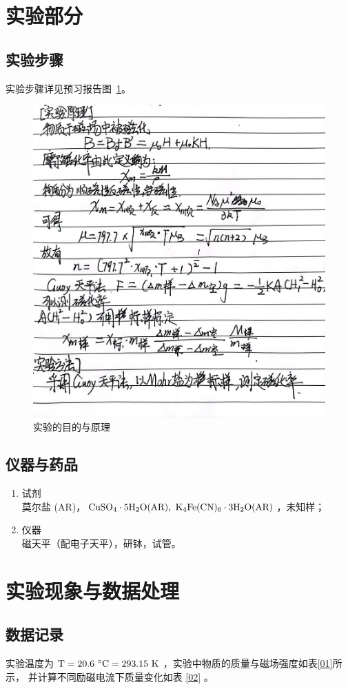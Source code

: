 \documentclass[cn,hazy,pku,12pt,normal,math=newtx,cite=super]{elegantnote}
\begin{document}
\section{实验部分}

\subsection{实验步骤}
实验步骤详见预习报告图~\ref{2}。

\begin{figure}[htbp]
    \centering
    \includegraphics[width = .70\textwidth]{image/yxbg_2.jpg}
    \caption{实验的目的与原理}\label{2}
\end{figure}

\subsection{仪器与药品}

\begin{enumerate} %
    \item 试剂 \\   莫尔盐 (AR)，$\rm CuSO_4 \cdot 5H_2O(AR),\  K_4Fe(CN)_6 \cdot 3H_2O(AR)$，未知样；
    \item 仪器 \\   磁天平（配电子天平），研钵，试管。
\end{enumerate}

\section{实验现象与数据处理}
\subsection[short]{数据记录}
实验温度为 $\rm T = 20.6\ \degree C = 293.15\ K$ ，实验中物质的质量与磁场强度如表\ref{01}所示，
并计算不同励磁电流下质量变化如表 \ref{02} 。
\end{document}
